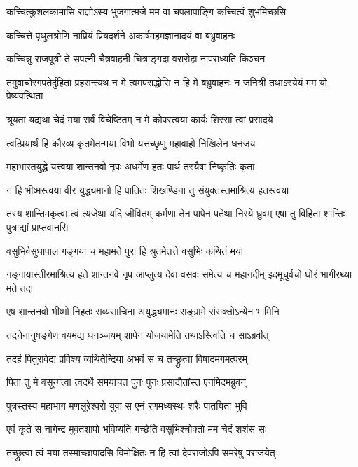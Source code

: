 \twolineshloka
{कच्चित्कुशलकामासि राज्ञोऽस्य भुजगात्मजे}
{मम वा चपलापाङ्गि कच्चित्वं शुभमिच्छसि}


\twolineshloka
{कच्चित्ते पृथुलश्रोणि नाप्रियं प्रियदर्शने}
{अकार्षमहमज्ञानादयं वा बभ्रुवाहनः}


\twolineshloka
{कच्चिन्नु राजपूत्री ते सपत्नी चैत्रवाहनी}
{चित्राङ्गदा वरारोहा नापराध्यति किञ्चन}


\threelineshloka
{तमुवाचोरगपतेर्दुहिता प्रहसन्त्यथ}
{न मे त्वमपराद्धोसि न हि मे बभ्रुवाहनः}
{न जनित्री तथाऽस्येयं मम यो प्रेष्यवत्थिता}


\twolineshloka
{श्रूयतां यद्यथा चेदं मया सर्वं विचेष्टितम्}
{न मे कोपस्त्वया कार्यः शिरसा त्वां प्रसादये}


\twolineshloka
{त्वत्प्रियार्थं हि कौरव्य कृतमेतन्मया विभो}
{यत्तच्छृणु महाबाहो निखिलेन धनंजय}


\twolineshloka
{महाभारतयुद्धे यत्त्वया शान्तनवो नृपः}
{अधर्मेण हतः पार्थ तस्यैषा निष्कृतिः कृता}


\twolineshloka
{न हि भीष्मस्त्वया वीर युद्ध्यमानो हि पातितः}
{शिखण्डिना तु संयुक्तस्तमाश्रित्य हतस्त्वया}


\threelineshloka
{तस्य शान्तिमकृत्वा त्वं त्यजेथा यदि जीवितम्}
{कर्मणा तेन पापेन पतेथा निरये ध्रुवम्}
{एषा तु विहिता शान्तिः पुत्राद्यां प्राप्तवानसि}


\twolineshloka
{वसुभिर्वसुधापाल गङ्गया च महामते}
{पुरा हि श्रुतमेतत्ते वसुभिः कथितं मया}


\threelineshloka
{गङ्गायास्तीरमाश्रित्य हते शान्तनवे नृप}
{आप्लुत्य देवा वसवः समेत्य च महानदीम्}
{इदमूचुर्वचो घोरं भागीरथ्या मते तदा}


\twolineshloka
{एष शान्तनवो भीष्मो निहतः सव्यसाचिना}
{अयुद्ध्यमानः सङ्ग्रामे संसक्तोऽन्येन भामिनि}


\twolineshloka
{तदनेनानुषङ्गेण वयमद्य धनञ्जयम्}
{शापेन योजयामेति तथाऽस्त्विति च साऽब्रवीत्}


\twolineshloka
{तदहं पितुरावेद्य प्रविश्य व्यथितेन्द्रिया}
{अभवं स च तच्छ्रुत्वा विषादमगमत्परम्}


\twolineshloka
{पिता तु मे वसून्गत्वा त्वदर्थे समयाचत}
{पुनः पुनः प्रसाद्यैतांस्त एनमिदमब्रुवन्}


\twolineshloka
{पुत्रस्तस्य महाभाग मणलूरेश्वरो युवा}
{स एनं रणमध्यस्थः शरैः पातयिता भुवि}


\twolineshloka
{एवं कृते स नागेन्द्र मुक्तशापो भविष्यति}
{गच्छेति वसुभिश्चोक्तो मम चेदं शशंस सः}


\twolineshloka
{तच्छ्रुत्वा त्वं मया तस्माच्छापादसि विमोक्षितः}
{न हि त्वां देवराजोऽपि समरेषु पराजयेत्}


